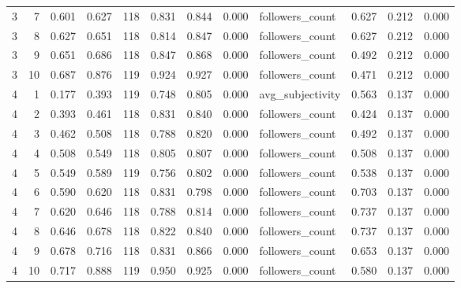 \begin{tabular}{rrrrrrrrlrrr}
3 & 7 & 0.601 & 0.627 & 118 & 0.831 & 0.844 & 0.000 & followers_count & 0.627 & 0.212 & 0.000 \\
3 & 8 & 0.627 & 0.651 & 118 & 0.814 & 0.847 & 0.000 & followers_count & 0.627 & 0.212 & 0.000 \\
3 & 9 & 0.651 & 0.686 & 118 & 0.847 & 0.868 & 0.000 & followers_count & 0.492 & 0.212 & 0.000 \\
3 & 10 & 0.687 & 0.876 & 119 & 0.924 & 0.927 & 0.000 & followers_count & 0.471 & 0.212 & 0.000 \\
4 & 1 & 0.177 & 0.393 & 119 & 0.748 & 0.805 & 0.000 & avg_subjectivity & 0.563 & 0.137 & 0.000 \\
4 & 2 & 0.393 & 0.461 & 118 & 0.831 & 0.840 & 0.000 & followers_count & 0.424 & 0.137 & 0.000 \\
4 & 3 & 0.462 & 0.508 & 118 & 0.788 & 0.820 & 0.000 & followers_count & 0.492 & 0.137 & 0.000 \\
4 & 4 & 0.508 & 0.549 & 118 & 0.805 & 0.807 & 0.000 & followers_count & 0.508 & 0.137 & 0.000 \\
4 & 5 & 0.549 & 0.589 & 119 & 0.756 & 0.802 & 0.000 & followers_count & 0.538 & 0.137 & 0.000 \\
4 & 6 & 0.590 & 0.620 & 118 & 0.831 & 0.798 & 0.000 & followers_count & 0.703 & 0.137 & 0.000 \\
4 & 7 & 0.620 & 0.646 & 118 & 0.788 & 0.814 & 0.000 & followers_count & 0.737 & 0.137 & 0.000 \\
4 & 8 & 0.646 & 0.678 & 118 & 0.822 & 0.840 & 0.000 & followers_count & 0.737 & 0.137 & 0.000 \\
4 & 9 & 0.678 & 0.716 & 118 & 0.831 & 0.866 & 0.000 & followers_count & 0.653 & 0.137 & 0.000 \\
4 & 10 & 0.717 & 0.888 & 119 & 0.950 & 0.925 & 0.000 & followers_count & 0.580 & 0.137 & 0.000 \\
\bottomrule
\end{tabular}
